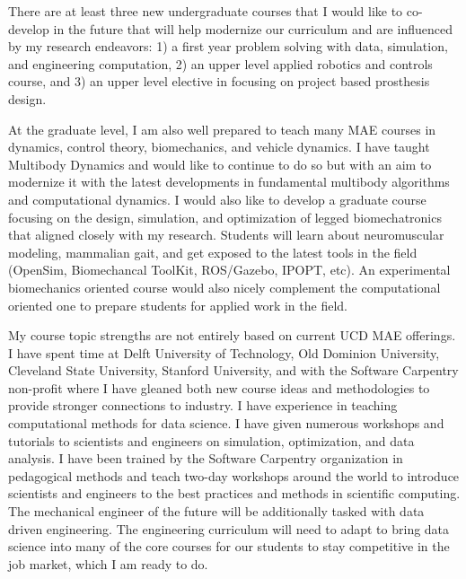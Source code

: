 \documentclass[titlepage]{article}
\begin{document}
There are at least three new undergraduate courses that I would like to
co-develop in the future that will help modernize our curriculum and are
influenced by my research endeavors: 1) a first year problem solving with data,
simulation, and engineering computation, 2) an upper level applied robotics and
controls course, and 3) an upper level elective in focusing on project based
prosthesis design.

At the graduate level, I am also well prepared to teach many MAE courses in
dynamics, control theory, biomechanics, and vehicle dynamics. I have taught
Multibody Dynamics and would like to continue to do so but with an aim to
modernize it with the latest developments in fundamental multibody algorithms
and computational dynamics. I would also like to develop a graduate course
focusing on the design, simulation, and optimization of legged biomechatronics
that aligned closely with my research. Students will learn about neuromuscular
modeling, mammalian gait, and get exposed to the latest tools in the field
(OpenSim, Biomechancal ToolKit, ROS/Gazebo, IPOPT, etc). An experimental
biomechanics oriented course would also nicely complement the computational
oriented one to prepare students for applied work in the field.

My course topic strengths are not entirely based on current UCD MAE offerings.
I have spent time at Delft University of Technology, Old Dominion University,
Cleveland State University, Stanford University, and with the Software
Carpentry non-profit where I have gleaned both new course ideas and
methodologies to provide stronger connections to industry. I have experience in
teaching computational methods for data science. I have given numerous
workshops and tutorials to scientists and engineers on simulation,
optimization, and data analysis. I have been trained by the Software Carpentry
organization in pedagogical methods and teach two-day workshops around the
world to introduce scientists and engineers to the best practices and methods
in scientific computing. The mechanical engineer of the future will be
additionally tasked with data driven engineering. The engineering curriculum
will need to adapt to bring data science into many of the core courses for our
students to stay competitive in the job market, which I am ready to do.
\end{document}
